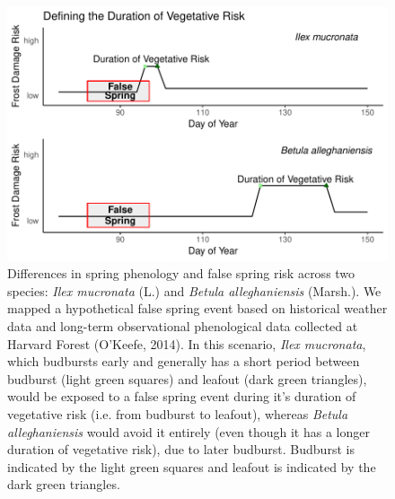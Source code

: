 \documentclass{article}\usepackage[]{graphicx}\usepackage[]{color}
\makeatletter
\def\maxwidth{ %
  \ifdim\Gin@nat@width>\linewidth
    \linewidth
  \else
    \Gin@nat@width
  \fi
}
\makeatother
\begin{document}
\begin{figure}[H]

{\centering \includegraphics[width=\maxwidth]{figure/risk-1} 

}

\caption{Differences in spring phenology and false spring risk across two species: \textit{Ilex mucronata} (L.) and \textit{Betula alleghaniensis} (Marsh.). We mapped a hypothetical false spring event based on historical weather data and long-term observational phenological data collected at Harvard Forest (O'Keefe, 2014). In this scenario, \textit{Ilex mucronata}, which budbursts early and generally has a short period between budburst (light green squares) and leafout (dark green triangles), would be exposed to a false spring event during it's duration of vegetative risk (i.e. from budburst to leafout), whereas \textit{Betula alleghaniensis} would avoid it entirely (even though it has a longer duration of vegetative risk), due to later budburst. Budburst is indicated by the light green squares and leafout is indicated by the dark green triangles.}\label{fig:risk}
\end{figure}
\end{document}
